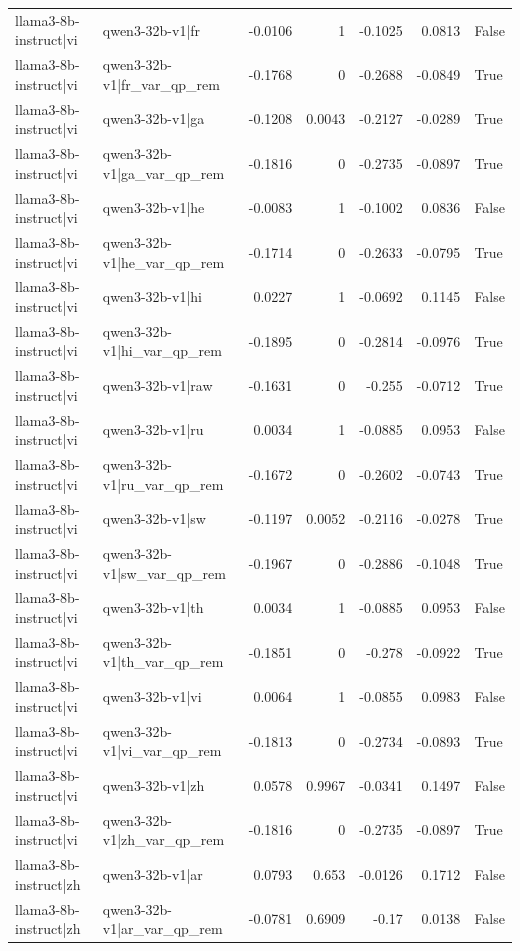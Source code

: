 \begin{table}
\begin{tabular}{l l r r r r l}
llama3-8b-instruct|vi & qwen3-32b-v1|fr & -0.0106 & 1 & -0.1025 & 0.0813 & False \\
llama3-8b-instruct|vi & qwen3-32b-v1|fr_var_qp_rem & -0.1768 & 0 & -0.2688 & -0.0849 & True \\
llama3-8b-instruct|vi & qwen3-32b-v1|ga & -0.1208 & 0.0043 & -0.2127 & -0.0289 & True \\
llama3-8b-instruct|vi & qwen3-32b-v1|ga_var_qp_rem & -0.1816 & 0 & -0.2735 & -0.0897 & True \\
llama3-8b-instruct|vi & qwen3-32b-v1|he & -0.0083 & 1 & -0.1002 & 0.0836 & False \\
llama3-8b-instruct|vi & qwen3-32b-v1|he_var_qp_rem & -0.1714 & 0 & -0.2633 & -0.0795 & True \\
llama3-8b-instruct|vi & qwen3-32b-v1|hi & 0.0227 & 1 & -0.0692 & 0.1145 & False \\
llama3-8b-instruct|vi & qwen3-32b-v1|hi_var_qp_rem & -0.1895 & 0 & -0.2814 & -0.0976 & True \\
llama3-8b-instruct|vi & qwen3-32b-v1|raw & -0.1631 & 0 & -0.255 & -0.0712 & True \\
llama3-8b-instruct|vi & qwen3-32b-v1|ru & 0.0034 & 1 & -0.0885 & 0.0953 & False \\
llama3-8b-instruct|vi & qwen3-32b-v1|ru_var_qp_rem & -0.1672 & 0 & -0.2602 & -0.0743 & True \\
llama3-8b-instruct|vi & qwen3-32b-v1|sw & -0.1197 & 0.0052 & -0.2116 & -0.0278 & True \\
llama3-8b-instruct|vi & qwen3-32b-v1|sw_var_qp_rem & -0.1967 & 0 & -0.2886 & -0.1048 & True \\
llama3-8b-instruct|vi & qwen3-32b-v1|th & 0.0034 & 1 & -0.0885 & 0.0953 & False \\
llama3-8b-instruct|vi & qwen3-32b-v1|th_var_qp_rem & -0.1851 & 0 & -0.278 & -0.0922 & True \\
llama3-8b-instruct|vi & qwen3-32b-v1|vi & 0.0064 & 1 & -0.0855 & 0.0983 & False \\
llama3-8b-instruct|vi & qwen3-32b-v1|vi_var_qp_rem & -0.1813 & 0 & -0.2734 & -0.0893 & True \\
llama3-8b-instruct|vi & qwen3-32b-v1|zh & 0.0578 & 0.9967 & -0.0341 & 0.1497 & False \\
llama3-8b-instruct|vi & qwen3-32b-v1|zh_var_qp_rem & -0.1816 & 0 & -0.2735 & -0.0897 & True \\
llama3-8b-instruct|zh & qwen3-32b-v1|ar & 0.0793 & 0.653 & -0.0126 & 0.1712 & False \\
llama3-8b-instruct|zh & qwen3-32b-v1|ar_var_qp_rem & -0.0781 & 0.6909 & -0.17 & 0.0138 & False \\

\end{tabular}
\end{table}
